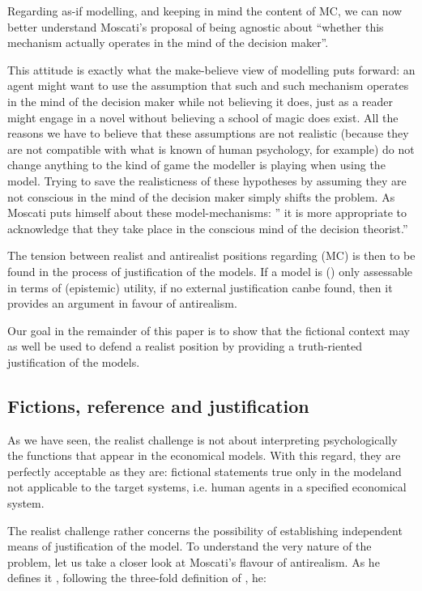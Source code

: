 \documentclass[a4paper,11pt]{article}
\theoremstyle{definition}
\begin{document}
{\color{red}{(Mettre une citation de Vaihinger ? Tu penses que ça peut être utile ?)}}

Regarding as-if modelling, and keeping in mind the content of MC, we can now better understand Moscati's proposal of being agnostic about ``whether this mechanism actually operates in the mind of the decision maker''. \citep[p.~2]{Moscati2023}

This attitude is exactly what the make-believe view of modelling puts forward: an agent might want to use the assumption that such and such mechanism operates in the mind of the decision maker while not believing it does, just as a reader might engage in a novel without believing a school of magic does exist. All the reasons we have to believe that these assumptions are not realistic (because they are not compatible with what is known of human psychology, for example) do not change anything to the kind of game the modeller is playing when using the model. Trying to save the realisticness of these hypotheses by assuming they are not conscious in the mind of the decision maker simply shifts the problem. As Moscati puts himself about these model-mechanisms: '' it is more appropriate to acknowledge that they take place in the conscious mind of the decision theorist.'' \citep[p.~12]{Moscati2023}

The tension between realist and antirealist positions regarding (MC) is then to be found in the process of justification of the models. If a model is ({\color{red}{in, e.g., Vaihinger's perspective}}) only assessable in terms of (epistemic) utility, if no external justification canbe found, then it provides an argument in favour of antirealism.

Our goal in the remainder of this paper is to show that the fictional context may as well be used to defend a realist position by providing a truth-riented justification of the models.


\subsection{Fictions, reference and justification}

As we have seen, the realist challenge is not about interpreting psychologically the functions that appear in the economical models. With this regard, they are perfectly acceptable as they are: fictional statements true only in the modeland not applicable to the target systems, i.e. human agents in a specified economical system.

The realist challenge rather concerns the possibility of establishing independent means of justification of the model. To understand the very nature of the problem, let us take a closer look at Moscati's flavour of antirealism. As he defines it \citep[pp.~18-20]{Moscati2023}, following the three-fold definition of \citep{Psillos1999}, he:
\end{document}
